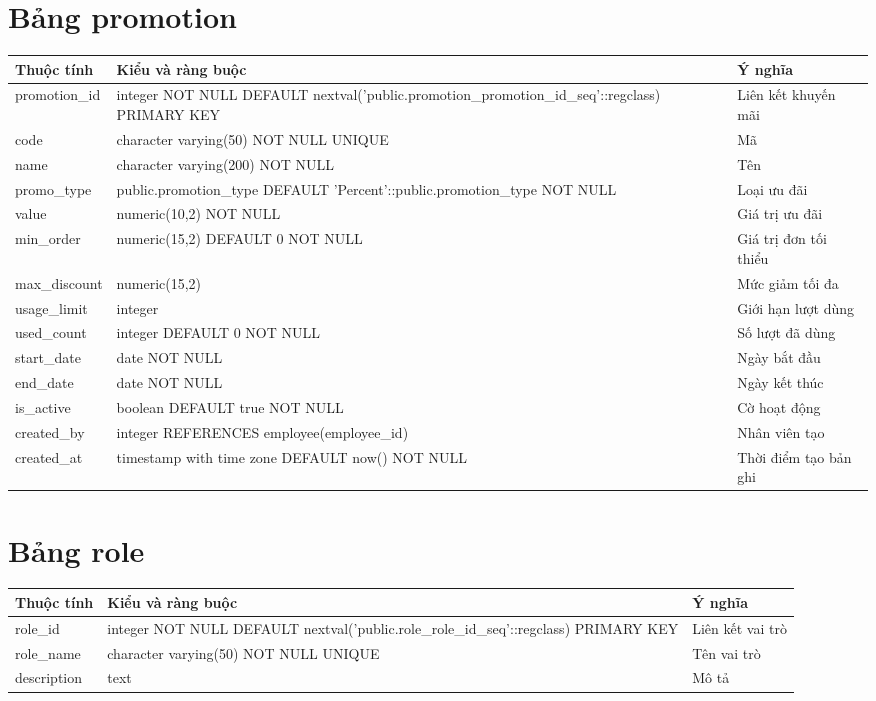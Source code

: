 \section{Bảng promotion}
\begin{longtable}{|p{}|p{}|p{}|}\hline
\textbf{Thuộc tính}&\textbf{Kiểu và ràng buộc}&\textbf{Ý nghĩa}\\\hline\endhead
promotion\_id & integer NOT NULL DEFAULT nextval('public.promotion\_promotion\_id\_seq'::regclass) PRIMARY KEY & Liên kết khuyến mãi\\\hline
code & character varying(50) NOT NULL UNIQUE & Mã\\\hline
name & character varying(200) NOT NULL & Tên\\\hline
promo\_type & public.promotion\_type DEFAULT 'Percent'::public.promotion\_type NOT NULL & Loại ưu đãi\\\hline
value & numeric(10,2) NOT NULL & Giá trị ưu đãi\\\hline
min\_order & numeric(15,2) DEFAULT 0 NOT NULL & Giá trị đơn tối thiểu\\\hline
max\_discount & numeric(15,2) & Mức giảm tối đa\\\hline
usage\_limit & integer & Giới hạn lượt dùng\\\hline
used\_count & integer DEFAULT 0 NOT NULL & Số lượt đã dùng\\\hline
start\_date & date NOT NULL & Ngày bắt đầu\\\hline
end\_date & date NOT NULL & Ngày kết thúc\\\hline
is\_active & boolean DEFAULT true NOT NULL & Cờ hoạt động\\\hline
created\_by & integer REFERENCES employee(employee\_id) & Nhân viên tạo\\\hline
created\_at & timestamp with time zone DEFAULT now() NOT NULL & Thời điểm tạo bản ghi\\\hline
\end{longtable}
\normalsize
\section{Bảng role}
\begin{longtable}{|p{}|p{}|p{}|}\hline
\textbf{Thuộc tính}&\textbf{Kiểu và ràng buộc}&\textbf{Ý nghĩa}\\\hline\endhead
role\_id & integer NOT NULL DEFAULT nextval('public.role\_role\_id\_seq'::regclass) PRIMARY KEY & Liên kết vai trò\\\hline
role\_name & character varying(50) NOT NULL UNIQUE & Tên vai trò\\\hline
description & text & Mô tả\\\hline
\end{longtable}
\normalsize
